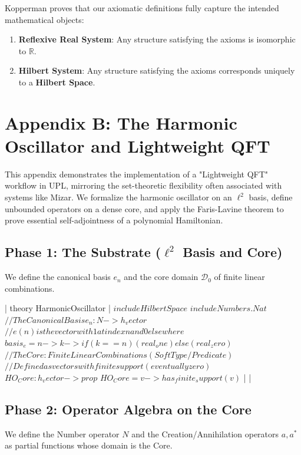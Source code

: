 \documentclass{stex}
\begin{document}
Kopperman proves that our axiomatic definitions fully capture the intended mathematical objects:
\begin{enumerate}
    \item \textbf{Reflexive Real System}: Any structure satisfying the axioms is isomorphic to $\mathbb{R}$.
    \item \textbf{Hilbert System}: Any structure satisfying the axioms corresponds uniquely to a \textbf{Hilbert Space}.
\end{enumerate}

\section{Appendix B: The Harmonic Oscillator and Lightweight QFT}

This appendix demonstrates the implementation of a "Lightweight QFT" workflow in UPL, mirroring the set-theoretic flexibility often associated with systems like Mizar. We formalize the harmonic oscillator on an $\ell^2$ basis, define unbounded operators on a dense core, and apply the Faris-Lavine theorem to prove essential self-adjointness of a polynomial Hamiltonian.

\subsection{Phase 1: The Substrate ($\ell^2$ Basis and Core)}

We define the canonical basis $e_n$ and the core domain $\mathcal{D}_0$ of finite linear combinations.

\uplinline|  theory HarmonicOscillator {|
\uplinline$    include HilbertSpace$
\uplinline$    include Numbers.Nat$
\uplinline$    $
\uplinline$    // The Canonical Basis e_n: N -> h_vector$
\uplinline$    // e(n) is the vector with 1 at index n and 0 elsewhere$
\uplinline$    basis_e = n -> k -> if (k == n) (real_one) else (real_zero) $
\uplinline$    $
\uplinline$    // The Core: Finite Linear Combinations (Soft Type / Predicate)$
\uplinline$    // Defined as vectors with finite support (eventually zero)$
\uplinline$    HO_Core : h_vector -> prop$
\uplinline$    HO_Core = v -> has_finite_support(v)$
\uplinline|  }| 

\subsection{Phase 2: Operator Algebra on the Core}

We define the Number operator $N$ and the Creation/Annihilation operators $a, a^*$ as partial functions whose domain is the Core.
\end{document}
